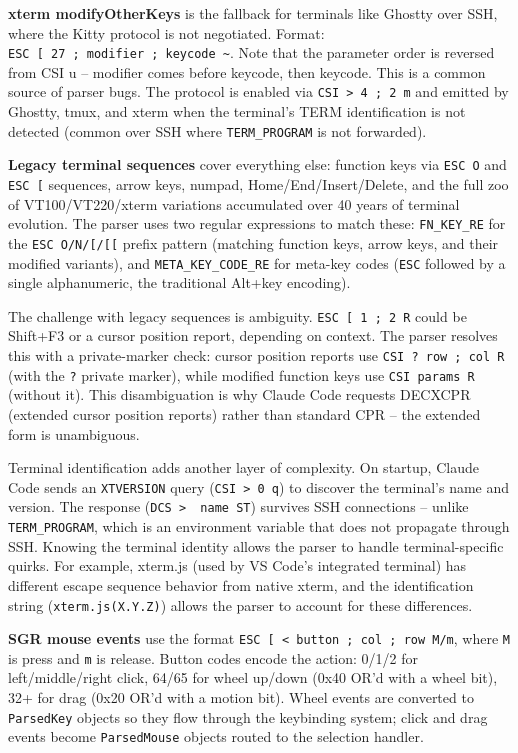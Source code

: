 \documentclass[
  english,
  11pt,
  letterpaper,
]{book}
\begin{document}
\textbf{xterm modifyOtherKeys} is the fallback for terminals like
Ghostty over SSH, where the Kitty protocol is not negotiated. Format:
\texttt{ESC\ {[}\ 27\ ;\ modifier\ ;\ keycode\ \textasciitilde{}}. Note
that the parameter order is reversed from CSI u -- modifier comes before
keycode, then keycode. This is a common source of parser bugs. The
protocol is enabled via \texttt{CSI\ \textgreater{}\ 4\ ;\ 2\ m} and
emitted by Ghostty, tmux, and xterm when the terminal's TERM
identification is not detected (common over SSH where
\texttt{TERM\_PROGRAM} is not forwarded).

\textbf{Legacy terminal sequences} cover everything else: function keys
via \texttt{ESC\ O} and \texttt{ESC\ {[}} sequences, arrow keys, numpad,
Home/End/Insert/Delete, and the full zoo of VT100/VT220/xterm variations
accumulated over 40 years of terminal evolution. The parser uses two
regular expressions to match these: \texttt{FN\_KEY\_RE} for the
\texttt{ESC\ O/N/{[}/{[}{[}} prefix pattern (matching function keys,
arrow keys, and their modified variants), and
\texttt{META\_KEY\_CODE\_RE} for meta-key codes (\texttt{ESC} followed
by a single alphanumeric, the traditional Alt+key encoding).

The challenge with legacy sequences is ambiguity.
\texttt{ESC\ {[}\ 1\ ;\ 2\ R} could be Shift+F3 or a cursor position
report, depending on context. The parser resolves this with a
private-marker check: cursor position reports use
\texttt{CSI\ ?\ row\ ;\ col\ R} (with the \texttt{?} private marker),
while modified function keys use \texttt{CSI\ params\ R} (without it).
This disambiguation is why Claude Code requests DECXCPR (extended cursor
position reports) rather than standard CPR -- the extended form is
unambiguous.

Terminal identification adds another layer of complexity. On startup,
Claude Code sends an \texttt{XTVERSION} query
(\texttt{CSI\ \textgreater{}\ 0\ q}) to discover the terminal's name and
version. The response
(\texttt{DCS\ \textgreater{}\ \textbar{}\ name\ ST}) survives SSH
connections -- unlike \texttt{TERM\_PROGRAM}, which is an environment
variable that does not propagate through SSH. Knowing the terminal
identity allows the parser to handle terminal-specific quirks. For
example, xterm.js (used by VS Code's integrated terminal) has different
escape sequence behavior from native xterm, and the identification
string (\texttt{xterm.js(X.Y.Z)}) allows the parser to account for these
differences.

\textbf{SGR mouse events} use the format
\texttt{ESC\ {[}\ \textless{}\ button\ ;\ col\ ;\ row\ M/m}, where
\texttt{M} is press and \texttt{m} is release. Button codes encode the
action: 0/1/2 for left/middle/right click, 64/65 for wheel up/down (0x40
OR'd with a wheel bit), 32+ for drag (0x20 OR'd with a motion bit).
Wheel events are converted to \texttt{ParsedKey} objects so they flow
through the keybinding system; click and drag events become
\texttt{ParsedMouse} objects routed to the selection handler.
\end{document}
